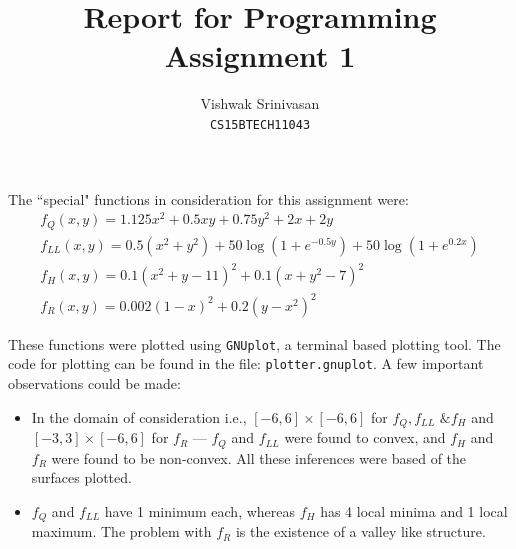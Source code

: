 \documentclass{article}
\title{Report for Programming Assignment 1}
\author{Vishwak Srinivasan\\
\texttt{CS15BTECH11043}}
\date{}
\begin{document}
\maketitle
\begin{flushleft}
The ``special" functions in consideration for this assignment were:
\begin{gather*}
f_{Q}(x, y) = 1.125x^2 + 0.5xy + 0.75y^2 + 2x + 2y \\
f_{LL}(x, y) = 0.5(x^2 + y^2) + 50\log\left(1 + e^{-0.5y}\right) + 50\log\left(1 + e^{0.2x}\right) \\
f_{H}(x, y) = 0.1(x^2 + y - 11)^2 + 0.1(x + y^2 - 7)^2 \\
f_{R}(x, y) = 0.002(1 - x)^2 + 0.2(y - x^2)^2
\end{gather*}

These functions were plotted using \texttt{GNUplot}, a terminal based plotting tool. The code for plotting can be found in the file: \texttt{plotter.gnuplot}. A few important observations could be made:
\begin{itemize}
\item In the domain of consideration i.e., \([-6, 6]\times[-6, 6]\) for \(f_{Q}, f_{LL} \text{ \& } f_{H}\) and \([-3, 3] \times [-6, 6]\) for \(f_{R}\) --- \(f_{Q}\) and \(f_{LL}\) were found to convex, and \(f_{H}\) and \(f_{R}\) were found to be non-convex. All these inferences were based of the surfaces plotted.
\item \(f_{Q}\) and \(f_{LL}\) have 1 minimum each, whereas \(f_{H}\) has 4 local minima and 1 local maximum. The problem with \(f_{R}\) is the existence of a valley like structure.
\end{itemize}


\end{flushleft}
\end{document}
